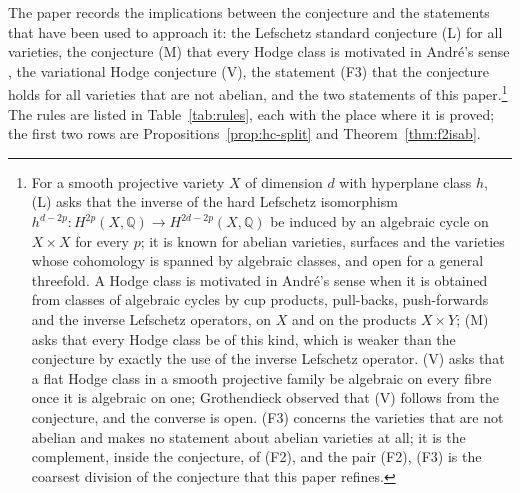 \documentclass[11pt,reqno]{amsart}
\makeatletter
\renewcommand\subsection{\@startsection{subsection}{2}\z@{.6\linespacing\@plus.7\linespacing}{.3\linespacing}{\normalfont\bfseries}}
\numberwithin{equation}{section}
\theoremstyle{plain}
\theoremstyle{definition}
\newcommand{\QQ}{\mathbb{Q}}
\newcommand{\Fii}{\texorpdfstring{\textup{(F2)}}{(F2)}}
\makeatother
\begin{document}
\subsection{The closure graph}\label{ssec:graph}

The paper \cite{BMB26} records the implications between the conjecture and the statements that have been used to approach it: the Lefschetz standard conjecture (L) for all varieties, the conjecture (M) that every Hodge class is motivated in Andr\'e's sense \cite{And96b}, the variational Hodge conjecture (V), the statement (F3) that the conjecture holds for all varieties that are not abelian, and the two statements of this paper.\footnote{For a smooth projective variety $X$ of dimension $d$ with hyperplane class $h$, (L) asks that the inverse of the hard Lefschetz isomorphism $h^{d-2p}\colon H^{2p}(X,\QQ)\to H^{2d-2p}(X,\QQ)$ be induced by an algebraic cycle on $X\times X$ for every $p$; it is known for abelian varieties, surfaces and the varieties whose cohomology is spanned by algebraic classes, and open for a general threefold. A Hodge class is motivated in Andr\'e's sense when it is obtained from classes of algebraic cycles by cup products, pull-backs, push-forwards and the inverse Lefschetz operators, on $X$ and on the products $X\times Y$; (M) asks that every Hodge class be of this kind, which is weaker than the conjecture by exactly the use of the inverse Lefschetz operator. (V) asks that a flat Hodge class in a smooth projective family be algebraic on every fibre once it is algebraic on one; Grothendieck observed that (V) follows from the conjecture, and the converse is open. (F3) concerns the varieties that are not abelian and makes no statement about abelian varieties at all; it is the complement, inside the conjecture, of \Fii{}, and the pair \Fii{}, (F3) is the coarsest division of the conjecture that this paper refines.} The rules are listed in Table~\ref{tab:rules}, each with the place where it is proved; the first two rows are Propositions~\ref{prop:hc-split} and Theorem~\ref{thm:f2isab}.
\end{document}
